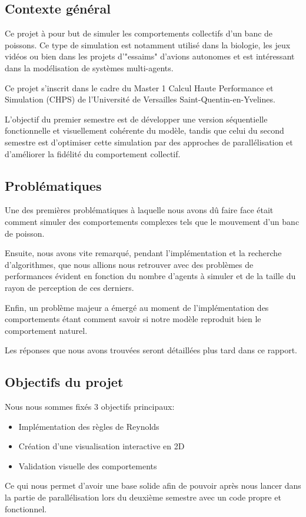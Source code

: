 \documentclass[11pt,a4paper]{article}
\begin{document}
\subsection{Contexte général}
Ce projet à pour but de simuler les comportements collectifs d'un banc de poissons. Ce type de simulation est notamment utilisé dans la biologie, les jeux vidéos ou bien dans les projets d'"essaims" d'avions autonomes et est intéressant dans la modélisation de systèmes multi-agents.

Ce projet s'inscrit dans le cadre du Master 1 Calcul Haute Performance et Simulation (CHPS) de l'Université de Versailles Saint-Quentin-en-Yvelines.

L’objectif du premier semestre est de développer une version séquentielle fonctionnelle et visuellement cohérente du modèle, tandis que celui du second semestre est d’optimiser cette simulation par des approches de parallélisation et d’améliorer la ﬁdélité du comportement collectif.

\subsection{Problématiques}
Une des premières problématiques à laquelle nous avons dû faire face était comment simuler des comportements complexes tels que le mouvement d'un banc de poisson.

Ensuite, nous avons vite remarqué, pendant l'implémentation et la recherche d'algorithmes, que nous allions nous retrouver avec des problèmes de performances évident en fonction du nombre d'agents à simuler et de la taille du rayon de perception de ces derniers.

Enfin, un problème majeur a émergé au moment de l'implémentation des comportements étant comment savoir si notre modèle reproduit bien le comportement naturel.

Les réponses que nous avons trouvées seront détaillées plus tard dans ce rapport.

\subsection{Objectifs du projet}
Nous nous sommes fixés 3 objectifs principaux:
\begin{itemize}
    \item Implémentation des règles de Reynolds
    \item Création d'une visualisation interactive en 2D
    \item Validation visuelle des comportements 
\end{itemize}
Ce qui nous permet d'avoir une base solide afin de pouvoir après nous lancer dans la partie de parallélisation lors du deuxième semestre avec un code propre et fonctionnel.
\end{document}
